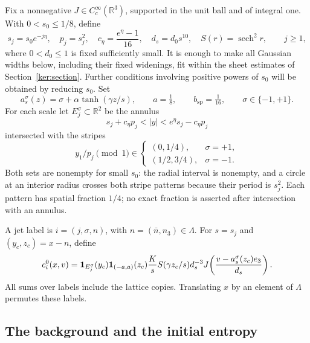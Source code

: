 Fix a nonnegative \(J\in C_c^\infty(\mathbb R^3)\), supported in the
unit ball and of integral one.  With \(0<s_0\le1/8\), define
\begin{equation}
 s_j=s_0e^{-j\eta},\quad p_j=s_j^2,\quad
 c_\eta=\frac{e^\eta-1}{16},\quad
 d_s=d_0s^{10},\quad S(r)=\operatorname{sech}^2r,
 \qquad j\ge1,
 \label{con:scales}
\end{equation}
where \(0<d_0\le1\) is fixed sufficiently small.  It is enough to
make all Gaussian widths below, including their fixed widenings, fit
within the sheet estimates of Section~\ref{ker:section}.  Further
conditions involving positive powers of \(s_0\) will be obtained by
reducing \(s_0\).  Set
\[
 a_s^\sigma(z)=\sigma+\alpha\tanh(\gamma z/s),\qquad
 a=\tfrac18,\qquad b_{\mathrm{sp}}=\tfrac1{16},
 \qquad \sigma\in\{-1,+1\}.
\]
For each scale let \(E_j^\sigma\subset\mathbb R^2\) be the annulus
\[
 s_j+c_\eta p_j<|y|<e^\eta s_j-c_\eta p_j
\]
intersected with the stripes
\[
 y_1/p_j\pmod1\in
 \begin{cases}
 (0,1/4),&\sigma=+1,\\
 (1/2,3/4),&\sigma=-1.
 \end{cases}
\]
Both sets are nonempty for small \(s_0\): the radial interval is
nonempty, and a circle at an interior radius crosses both stripe
patterns because their period is \(s_j^2\).  Each pattern has spatial
fraction \(1/4\); no exact fraction is asserted after intersection
with an annulus.

A jet label is \(i=(j,\sigma,n)\), with \(n=(\bar n,n_3)\in\Lambda\).
For \(s=s_j\) and \((y_c,z_c)=x-n\), define
\begin{equation}
 c_i^0(x,v)=
 \mathbf 1_{E_j^\sigma}(y_c)\mathbf 1_{(-a,a)}(z_c)
 \frac K{s}S(\gamma z_c/s)d_s^{-3}
 J\!\left(\frac{v-a_s^\sigma(z_c)e_3}{d_s}\right).
 \label{con:jet-datum}
\end{equation}
All sums over labels include the lattice copies.  Translating \(x\)
by an element of \(\Lambda\) permutes these labels.

\subsection{The background and the initial entropy}


